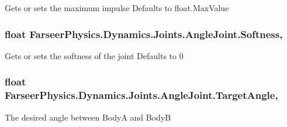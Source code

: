 Gets or sets the maximum impulse Defaults to float.\+Max\+Value 

\hypertarget{class_farseer_physics_1_1_dynamics_1_1_joints_1_1_angle_joint_a27a6002baec2d2afa8e8ffdc506a8726}{
\subsubsection[{Softness}]{\setlength{\rightskip}{0pt plus 5cm}float Farseer\+Physics.\+Dynamics.\+Joints.\+Angle\+Joint.\+Softness\hspace{0.3cm}{\ttfamily [get]}, {\ttfamily [set]}}}\label{class_farseer_physics_1_1_dynamics_1_1_joints_1_1_angle_joint_a27a6002baec2d2afa8e8ffdc506a8726}


Gets or sets the softness of the joint Defaults to 0 

\hypertarget{class_farseer_physics_1_1_dynamics_1_1_joints_1_1_angle_joint_ab71740c25d87b0a1f80804387f7c733d}{
\subsubsection[{Target\+Angle}]{\setlength{\rightskip}{0pt plus 5cm}float Farseer\+Physics.\+Dynamics.\+Joints.\+Angle\+Joint.\+Target\+Angle\hspace{0.3cm}{\ttfamily [get]}, {\ttfamily [set]}}}\label{class_farseer_physics_1_1_dynamics_1_1_joints_1_1_angle_joint_ab71740c25d87b0a1f80804387f7c733d}


The desired angle between Body\+A and Body\+B 

